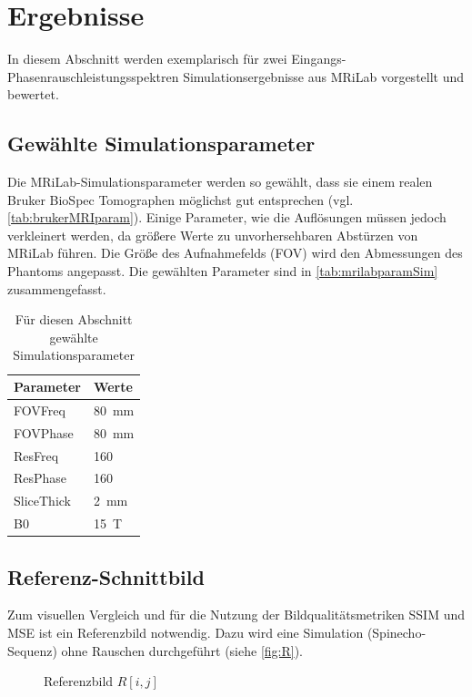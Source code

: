 \chapter{Ergebnisse}
In diesem Abschnitt werden exemplarisch für zwei Eingangs-Phasenrauschleistungsspektren Simulationsergebnisse aus MRiLab vorgestellt und bewertet.

\section{Gewählte Simulationsparameter}
Die MRiLab-Simulationsparameter werden so gewählt, dass sie einem realen Bruker BioSpec Tomographen möglichst gut entsprechen (vgl. \autoref{tab:brukerMRIparam}). Einige Parameter, wie die Auflösungen müssen jedoch verkleinert werden, da größere Werte zu unvorhersehbaren Abstürzen von MRiLab führen. Die Größe des Aufnahmefelds (FOV) wird den Abmessungen des Phantoms angepasst. Die gewählten Parameter sind in \autoref{tab:mrilabparamSim} zusammengefasst.

\begin{table}[H]
	\centering
	\caption[gewählte Simulationsparameter]{Für diesen Abschnitt gewählte Simulationsparameter}
	\label{tab:mrilabparamSim}
	\begin{tabularx}{0.5\textwidth}{lX}
		\toprule
		\textbf{Parameter} & \textbf{Werte}\\
		\midrule
		FOVFreq    & \SI{80}{\mm}\\
		FOVPhase   & \SI{80}{\mm}\\
		ResFreq    & 160\\
		ResPhase   & 160\\
		SliceThick & \SI{2}{\mm}\\
		B0         & \SI{15}{\tesla} \\
		\bottomrule
		\end{tabularx}
		\end{table}

\section{Referenz-Schnittbild}
Zum visuellen Vergleich und für die Nutzung der Bildqualitätsmetriken SSIM und MSE ist ein Referenzbild notwendig. Dazu wird eine Simulation (Spinecho-Sequenz) ohne Rauschen durchgeführt (siehe \autoref{fig:R}).

\begin{figure}[H]
	\centering
	\caption[Referenzbild]{Referenzbild $R[i,j]$}
	\label{fig:R}
\end{figure}

